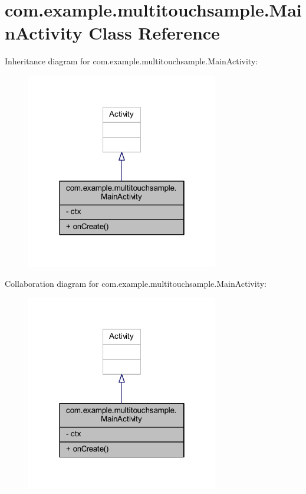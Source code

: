 \hypertarget{classcom_1_1example_1_1multitouchsample_1_1_main_activity}{}\section{com.\+example.\+multitouchsample.\+Main\+Activity Class Reference}
\label{classcom_1_1example_1_1multitouchsample_1_1_main_activity}


Inheritance diagram for com.\+example.\+multitouchsample.\+Main\+Activity\+:
\nopagebreak
\begin{figure}[H]
\begin{center}
\leavevmode
\includegraphics[width=238pt]{classcom_1_1example_1_1multitouchsample_1_1_main_activity__inherit__graph}
\end{center}
\end{figure}


Collaboration diagram for com.\+example.\+multitouchsample.\+Main\+Activity\+:
\nopagebreak
\begin{figure}[H]
\begin{center}
\leavevmode
\includegraphics[width=238pt]{classcom_1_1example_1_1multitouchsample_1_1_main_activity__coll__graph}
\end{center}
\end{figure}
